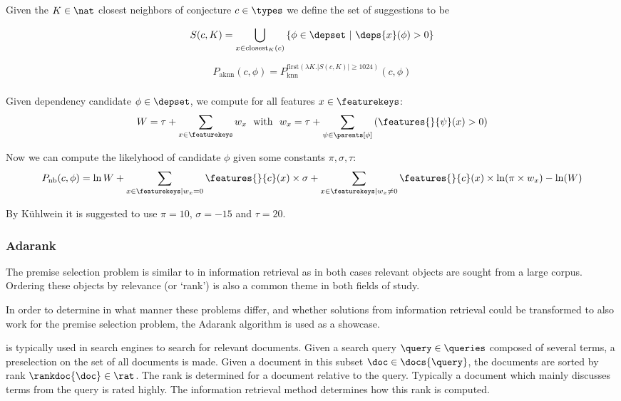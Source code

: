 \begin{definition}
  Given the $K \in \nat$ closest neighbors of conjecture $c \in \types$ we define the set of suggestions to be

  $$
    S(c, K) = \bigcup_{x \in \text{closest}_K(c)} \left\{ \phi \in \depset ~|~ \deps{x}(\phi) > 0 \right\}
  $$
\end{definition}

\begin{definition}
  $$
    P_\text{aknn}(c, \phi) = P^{\text{first}(\lambda K . |S(c, K)| \geq 1024)}_\text{knn}(c, \phi)
  $$
\end{definition}

\subsubsection{\nb}

Given dependency candidate $\phi \in \depset$, we compute for all features $x \in \featurekeys$:
\[
  W = \tau + \sum_{x \in \featurekeys} w_x ~~\text{with}~~ w_x = \tau + \sum_{\psi \in \parents[\phi]} \left( \features{}{\psi}(x) > 0 \right)
\]

Now we can compute the likelyhood of candidate $\phi$ given some constants $\pi, \sigma, \tau$:
\[
	P_\text{nb}(c, \phi) = \ln W +
  \sum_{x \in \featurekeys | w_x = 0} \features{}{c}(x) \times \sigma +
  \sum_{x \in \featurekeys | w_x \neq 0} \features{}{c}(x) \times \ln(\pi \times w_x) - \ln(W)
\]

By K\"uhlwein \cite{kuhlwein2013mash} it is suggested to use $\pi = 10$, $\sigma = -15$ and $\tau = 20$.

\subsubsection{Adarank}
The premise selection problem is similar to \ltr in information retrieval
as in both cases relevant objects are sought from a large corpus.
Ordering these objects by relevance (or `rank') is also a common theme in both fields of study.

In order to determine in what manner these problems differ, and whether solutions
from information retrieval could be transformed to also work for the premise selection problem,
the Adarank algorithm \cite{xu2007adarank} is used as a showcase.

\ltr is typically used in search engines to search for relevant documents.
Given a search query $\query \in \queries$ composed of several terms, a preselection on the set of
all documents is made. Given a document in this subset $\doc \in \docs{\query}$,
the documents are sorted by rank $\rankdoc{\doc} \in \rat$.
The rank is determined for a document relative to the query.
Typically a document which mainly discusses terms from the query is rated highly.
The information retrieval method determines how this rank is computed.

